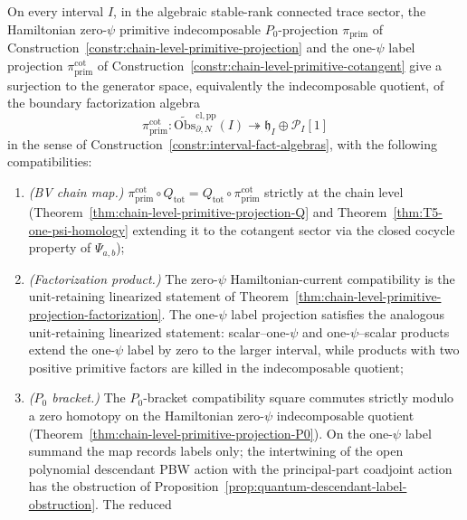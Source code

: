 \begin{thm}\label{thm:chain-level-primitive-projection}
  On every interval \(I\), in the algebraic stable-rank connected trace
  sector, the Hamiltonian zero-\(\psi\) primitive
  indecomposable \(P_0\)-projection
  $\pi_{\mathrm{prim}}$ of
  Construction~\ref{constr:chain-level-primitive-projection} and the
  one-$\psi$ label projection $\pi_{\mathrm{prim}}^{\mathrm{cot}}$ of
  Construction~\ref{constr:chain-level-primitive-cotangent} give a
  surjection to the generator space, equivalently the indecomposable
  quotient, of the boundary factorization algebra
  $$\pi_{\mathrm{prim}}^{\mathrm{cot}}:
    \widetilde{\mathrm{Obs}}^{\mathrm{cl,pp}}_{\partial,N}(I)
    \twoheadrightarrow
    \mathfrak h_I\oplus\mathcal P_I[1]$$
  in the sense of Construction~\ref{constr:interval-fact-algebras},
  with the following compatibilities:
  \begin{enumerate}
    \item \emph{(BV chain map.)}
      $\pi_{\mathrm{prim}}^{\mathrm{cot}}\circ Q_{\mathrm{tot}}
      =Q_{\mathrm{tot}}\circ\pi_{\mathrm{prim}}^{\mathrm{cot}}$
      strictly at the chain level
      (Theorem~\ref{thm:chain-level-primitive-projection-Q} and
      Theorem~\ref{thm:T5-one-psi-homology} extending it to the
      cotangent sector via the closed cocycle property of $\Psi_{a,b}$);
    \item \emph{(Factorization product.)}
      The zero-\(\psi\) Hamiltonian-current compatibility is
      the unit-retaining linearized statement of
      Theorem~\ref{thm:chain-level-primitive-projection-factorization}.
      The one-\(\psi\) label projection satisfies the analogous
      unit-retaining linearized statement: scalar--one-\(\psi\) and
      one-\(\psi\)--scalar products extend the one-\(\psi\) label by zero
      to the larger interval, while products with two positive primitive
      factors are killed in the indecomposable quotient;
		    \item \emph{($P_0$ bracket.)} The $P_0$-bracket compatibility
		      square commutes strictly modulo a zero homotopy on the
		      Hamiltonian zero-$\psi$ indecomposable quotient
		      (Theorem~\ref{thm:chain-level-primitive-projection-P0}). On the
			      one-$\psi$ label summand the map records labels only; the
		      intertwining of the open polynomial descendant PBW action
		      with the principal-part coadjoint action has the obstruction
		      of Proposition~\ref{prop:quantum-descendant-label-obstruction}. The reduced

\end{enumerate}
\end{thm}
